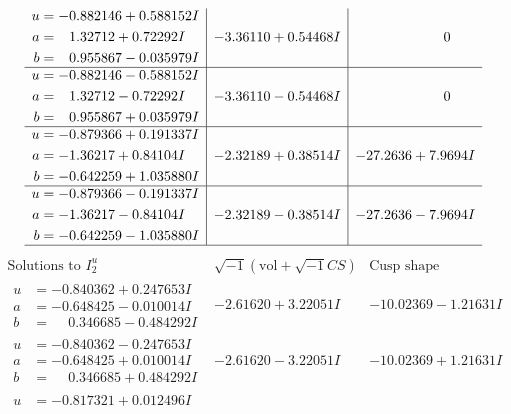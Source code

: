 \documentclass[1p]{elsarticle_modified}
\theoremstyle{definition}
\newcommand{\I}{\sqrt{-1}}
\begin{document}
$$\begin{array}{c|c|c}
\begin{aligned}
u &= -0.882146 + 0.588152 I \\
a &= \phantom{-}1.32712 + 0.72292 I \\
b &= \phantom{-}0.955867 - 0.035979 I\end{aligned}
 & -3.36110 + 0.54468 I & \phantom{-0.000000 } 0 \\ \hline\begin{aligned}
u &= -0.882146 - 0.588152 I \\
a &= \phantom{-}1.32712 - 0.72292 I \\
b &= \phantom{-}0.955867 + 0.035979 I\end{aligned}
 & -3.36110 - 0.54468 I & \phantom{-0.000000 } 0 \\ \hline\begin{aligned}
u &= -0.879366 + 0.191337 I \\
a &= -1.36217 + 0.84104 I \\
b &= -0.642259 + 1.035880 I\end{aligned}
 & -2.32189 + 0.38514 I & -27.2636 + 7.9694 I \\ \hline\begin{aligned}
u &= -0.879366 - 0.191337 I \\
a &= -1.36217 - 0.84104 I \\
b &= -0.642259 - 1.035880 I\end{aligned}
 & -2.32189 - 0.38514 I & -27.2636 - 7.9694 I\\
 \hline 
 \end{array}$$\newpage$$\begin{array}{c|c|c}  
\text{Solutions to }I^u_{2}& \I (\text{vol} + \sqrt{-1}CS) & \text{Cusp shape}\\
 \hline 
\begin{aligned}
u &= -0.840362 + 0.247653 I \\
a &= -0.648425 - 0.010014 I \\
b &= \phantom{-}0.346685 - 0.484292 I\end{aligned}
 & -2.61620 + 3.22051 I & -10.02369 - 1.21631 I \\ \hline\begin{aligned}
u &= -0.840362 - 0.247653 I \\
a &= -0.648425 + 0.010014 I \\
b &= \phantom{-}0.346685 + 0.484292 I\end{aligned}
 & -2.61620 - 3.22051 I & -10.02369 + 1.21631 I \\ \hline\begin{aligned}
u &= -0.817321 + 0.012496 I \\

\end{aligned}
\end{array}$$
\end{document}
